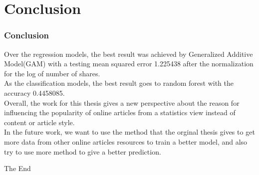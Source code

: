 \documentclass{beamer}
\begin{document}
\section{Conclusion}

\begin{frame}
\frametitle{Conclusion}
Over the regression models, the best result was achieved by Generalized Additive Model(GAM) with a testing mean squared error 1.225438 after the normalization for the log of number of shares.\\
As the classification models, the best result goes to random forest with the accuracy 0.4458085.\\
Overall, the work for this thesis gives a new perspective about the reason for influencing the popularity of online articles from a statistics view instead of content or article style. \\
In the future work, we want to use the method that the orginal thesis gives to get more data from other online articles resources to train a better model, and also try to use more method to give a better prediction.

\end{frame}


\begin{frame}
\Huge{\centerline{The End}}
\end{frame}

\end{document}

